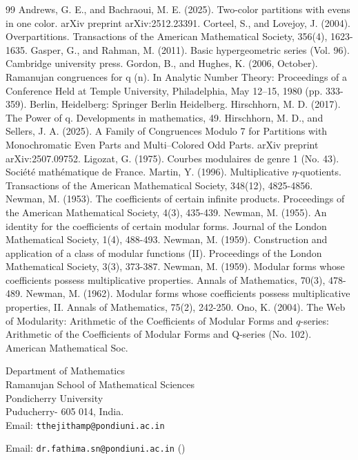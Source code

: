 \documentclass[11pt,a4paper]{article}
\numberwithin{equation}{section}
\theoremstyle{plain}
\begin{document}
		\begin{thebibliography}{99}
		Andrews, G. E., and Bachraoui, M. E. (2025). Two-color partitions with evens in one color. arXiv preprint arXiv:2512.23391.
		Corteel, S., and Lovejoy, J. (2004). Overpartitions. Transactions of the American Mathematical Society, 356(4), 1623-1635.
		Gasper, G., and Rahman, M. (2011). Basic hypergeometric series (Vol. 96). Cambridge university press.
		Gordon, B., and Hughes, K. (2006, October). Ramanujan congruences for q (n). In Analytic Number Theory: Proceedings of a Conference Held at Temple University, Philadelphia, May 12–15, 1980 (pp. 333-359). Berlin, Heidelberg: Springer Berlin Heidelberg.
		Hirschhorn, M. D. (2017). The Power of q. Developments in mathematics, 49.
		Hirschhorn, M. D., and Sellers, J. A. (2025). A Family of Congruences Modulo 7 for Partitions with Monochromatic Even Parts and Multi--Colored Odd Parts. arXiv preprint arXiv:2507.09752.
		Ligozat, G. (1975). Courbes modulaires de genre 1 (No. 43). Société mathématique de France.
			Martin, Y. (1996). Multiplicative $\eta$-quotients. Transactions of the American Mathematical Society, 348(12), 4825-4856.
		Newman, M. (1953). The coefficients of certain infinite products. Proceedings of the American Mathematical Society, 4(3), 435-439.
		Newman, M. (1955). An identity for the coefficients of certain modular forms. Journal of the London Mathematical Society, 1(4), 488-493.
		Newman, M. (1959). Construction and application of a class of modular functions (II). Proceedings of the London Mathematical Society, 3(3), 373-387.
		Newman, M. (1959). Modular forms whose coefficients possess multiplicative properties. Annals of Mathematics, 70(3), 478-489.
		Newman, M. (1962). Modular forms whose coefficients possess multiplicative properties, II. Annals of Mathematics, 75(2), 242-250.
		Ono, K. (2004). The Web of Modularity: Arithmetic of the Coefficients of Modular Forms and $ q $-series: Arithmetic of the Coefficients of Modular Forms and Q-series (No. 102). American Mathematical Soc.
	\end{thebibliography}
	\bigskip
	\bigskip
	
	\noindent
	Department of Mathematics\\
	Ramanujan School of Mathematical Sciences\\
	Pondicherry University\\
	Puducherry- 605 014, India.\\
	
	
	\noindent Email: \texttt{tthejithamp@pondiuni.ac.in}
	
	\noindent	Email: \texttt{dr.fathima.sn@pondiuni.ac.in} (\Letter)
\end{document}
